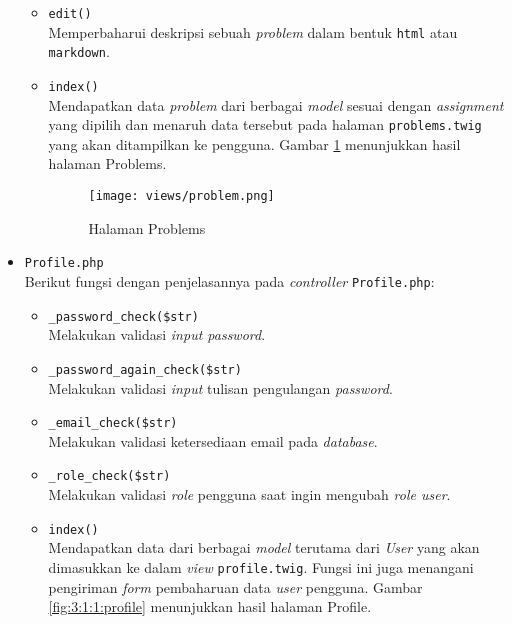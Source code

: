 \begin{itemize}
            \begin{itemize}
                  \item \verb|edit()| \\
                        Memperbaharui deskripsi sebuah \textit{problem} dalam bentuk \verb|html| atau \verb|markdown|.
                  \item \verb|index()| \\
                        Mendapatkan data \textit{problem} dari berbagai \textit{model} sesuai dengan \textit{assignment} yang dipilih dan menaruh data tersebut pada halaman \verb|problems.twig| yang akan ditampilkan ke pengguna. Gambar \ref{fig:3:1:1:problem} menunjukkan hasil halaman Problems.

                        \begin{figure}[H]
                              \centering
                              \texttt{[image: views/problem.png]}
                              \caption{Halaman Problems}
                              \label{fig:3:1:1:problem}
                        \end{figure}

            \end{itemize}

      \item \verb|Profile.php| \\
            Berikut fungsi dengan penjelasannya pada \textit{controller} \verb|Profile.php|:

            \begin{itemize}
                  \item \verb|_password_check($str)| \\
                        Melakukan validasi \textit{input password}.
                  \item \verb|_password_again_check($str)| \\
                        Melakukan validasi \textit{input} tulisan pengulangan \textit{password}.
                  \item \verb|_email_check($str)| \\
                        Melakukan validasi ketersediaan email pada \textit{database}.
                  \item \verb|_role_check($str)| \\
                        Melakukan validasi \textit{role} pengguna saat ingin mengubah \textit{role user}.
                  \item \verb|index()| \\
                        Mendapatkan data dari berbagai \textit{model} terutama dari \textit{User} yang akan dimasukkan ke dalam \textit{view} \verb|profile.twig|. Fungsi ini juga menangani pengiriman \textit{form} pembaharuan data \textit{user} pengguna. Gambar \ref{fig:3:1:1:profile} menunjukkan hasil halaman Profile.


\end{itemize}
\end{itemize}
